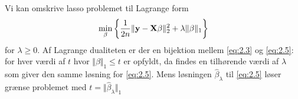 Vi kan omskrive lasso problemet til Lagrange form
\begin{align}
\min_{\beta} \cbr{\frac{1}{2n} \Vert \y - \X \beta \Vert_2^2 + \lambda \Vert \beta \Vert_1} \label{eq:2.5}
\end{align}
for $\lambda \geq 0$.
Af Lagrange dualiteten er der en bijektion mellem \eqref{eq:2.3} og \eqref{eq:2.5}: for hver værdi af \(t\) hvor \(\Vert \beta \Vert_1 \leq t\) er opfyldt, da findes en tilhørende værdi af $\lambda$ som giver den samme løsning for \eqref{eq:2.5}.
Mens løsningen $\hat{\beta}_\lambda$ til \eqref{eq:2.5} løser grænse problemet med $t=\Vert \hat{\beta}_\lambda \Vert_1$

 
